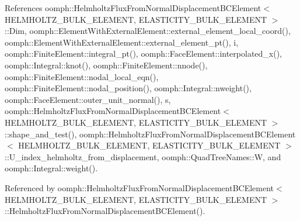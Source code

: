 References oomph\+::\+Helmholtz\+Flux\+From\+Normal\+Displacement\+B\+C\+Element$<$ H\+E\+L\+M\+H\+O\+L\+T\+Z\+\_\+\+B\+U\+L\+K\+\_\+\+E\+L\+E\+M\+E\+N\+T, E\+L\+A\+S\+T\+I\+C\+I\+T\+Y\+\_\+\+B\+U\+L\+K\+\_\+\+E\+L\+E\+M\+E\+N\+T $>$\+::\+Dim, oomph\+::\+Element\+With\+External\+Element\+::external\+\_\+element\+\_\+local\+\_\+coord(), oomph\+::\+Element\+With\+External\+Element\+::external\+\_\+element\+\_\+pt(), i, oomph\+::\+Finite\+Element\+::integral\+\_\+pt(), oomph\+::\+Face\+Element\+::interpolated\+\_\+x(), oomph\+::\+Integral\+::knot(), oomph\+::\+Finite\+Element\+::nnode(), oomph\+::\+Finite\+Element\+::nodal\+\_\+local\+\_\+eqn(), oomph\+::\+Finite\+Element\+::nodal\+\_\+position(), oomph\+::\+Integral\+::nweight(), oomph\+::\+Face\+Element\+::outer\+\_\+unit\+\_\+normal(), s, oomph\+::\+Helmholtz\+Flux\+From\+Normal\+Displacement\+B\+C\+Element$<$ H\+E\+L\+M\+H\+O\+L\+T\+Z\+\_\+\+B\+U\+L\+K\+\_\+\+E\+L\+E\+M\+E\+N\+T, E\+L\+A\+S\+T\+I\+C\+I\+T\+Y\+\_\+\+B\+U\+L\+K\+\_\+\+E\+L\+E\+M\+E\+N\+T $>$\+::shape\+\_\+and\+\_\+test(), oomph\+::\+Helmholtz\+Flux\+From\+Normal\+Displacement\+B\+C\+Element$<$ H\+E\+L\+M\+H\+O\+L\+T\+Z\+\_\+\+B\+U\+L\+K\+\_\+\+E\+L\+E\+M\+E\+N\+T, E\+L\+A\+S\+T\+I\+C\+I\+T\+Y\+\_\+\+B\+U\+L\+K\+\_\+\+E\+L\+E\+M\+E\+N\+T $>$\+::\+U\+\_\+index\+\_\+helmholtz\+\_\+from\+\_\+displacement, oomph\+::\+Quad\+Tree\+Names\+::W, and oomph\+::\+Integral\+::weight().



Referenced by oomph\+::\+Helmholtz\+Flux\+From\+Normal\+Displacement\+B\+C\+Element$<$ H\+E\+L\+M\+H\+O\+L\+T\+Z\+\_\+\+B\+U\+L\+K\+\_\+\+E\+L\+E\+M\+E\+N\+T, E\+L\+A\+S\+T\+I\+C\+I\+T\+Y\+\_\+\+B\+U\+L\+K\+\_\+\+E\+L\+E\+M\+E\+N\+T $>$\+::\+Helmholtz\+Flux\+From\+Normal\+Displacement\+B\+C\+Element().

\mbox{\label{classoomph_1_1HelmholtzFluxFromNormalDisplacementBCElement_a778e21256d01c8b51e4d9ab8e5767d5f}} 
